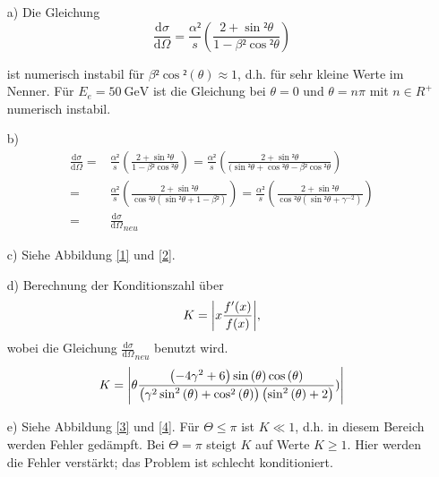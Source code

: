 \begin{itemize}

\item[a)] Die Gleichung 
\begin{equation*}
\frac{\mathup{d}\sigma}{\mathup{d}\Omega}=\frac{\alpha²}{s}\left(\frac{2+\sin²{\theta}}{1-\beta²\cos²{\theta}}\right)
\end{equation*}

ist numerisch instabil für $\beta²\cos²{(\theta)}\approx 1$, d.h. für sehr kleine Werte im Nenner. 
Für $E_e=\SI{50}{\giga\electronvolt}$ ist die Gleichung bei $\theta=0$ und $\theta=n\pi$ mit $n\in{R^+}$ numerisch instabil.

\item[b)] 
\begin{align*}
\frac{\mathup{d}\sigma}{\mathup{d}\Omega}=&\frac{\alpha²}{s}\left(\frac{2+\sin²{\theta}}{1-\beta²\cos²{\theta}}\right)
=\frac{\alpha²}{s}\left(\frac{2+\sin²{\theta}}{(\sin²{\theta}+\cos²{\theta}-\beta²\cos²{\theta}}\right)\\
=&\frac{\alpha²}{s}\left(\frac{2+\sin²{\theta}}{\cos²{\theta}(\sin²{\theta}+1-\beta²)}\right)
=\frac{\alpha²}{s}\left(\frac{2+\sin²{\theta}}{\cos²{\theta}(\sin²{\theta}+\gamma^{-2})}\right)\\
=&\frac{\mathup{d}\sigma}{\mathup{d}\Omega}_{neu}
\end{align*}
\newpage
\item[c)] Siehe Abbildung \ref{1} und \ref{2}.

\item[d)] Berechnung der Konditionszahl über
\begin{equation*}
K=\abs*{x\frac{f'(x)}{f(x)}},
\end{equation*}
wobei die Gleichung $\frac{\mathup{d}\sigma}{\mathup{d}\Omega}_{neu}$ benutzt wird.
\begin{equation*}
K=\abs*{\theta\frac{\left(- 4 \gamma^{2} + 6\right) \sin{\left (\theta \right )} \cos{\left (\theta \right )}}{\left(\gamma^{2} \sin^{2}{\left (\theta\right )} + \cos^{2}{\left (\theta \right )}\right) \left(\sin^{2}{\left (\theta \right )} + 2\right)})}
\end{equation*}

\item[e)] Siehe Abbildung \ref{3} und \ref{4}. Für $\Theta\leq \pi$ ist $K\ll 1$, d.h. in diesem Bereich werden Fehler gedämpft. Bei $\Theta= \pi$ steigt $K$ auf Werte $K\geq1$. Hier werden die Fehler verstärkt; das Problem ist schlecht konditioniert.
\end{itemize}

